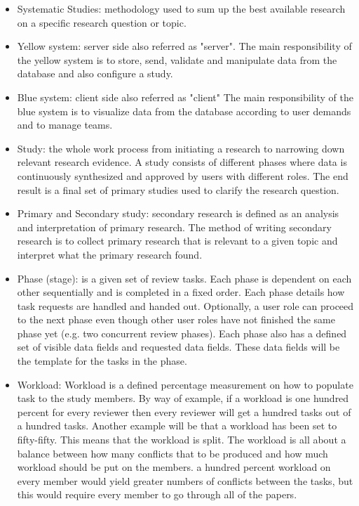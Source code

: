 \begin{itemize}
	\item Systematic Studies: methodology used to sum up the best available research on a specific research question or topic.  
	\item Yellow system: server side also referred as "server". The main responsibility of the yellow system is to store, send, validate and manipulate data from the database and also configure a study.
	\item Blue system: client side also referred as "client" The main responsibility of the blue system is to visualize data from the database according to user demands and to manage teams.
	\item Study: the whole work process from initiating a research to narrowing down relevant research evidence. A study consists of different phases where data is continuously synthesized and approved by users with different roles. The end result is a final set of primary studies used to clarify the research question. 
	\item Primary and Secondary study: secondary research is defined as an analysis and interpretation of primary research. The method of writing secondary research is to collect primary research that is relevant to a given topic and interpret what the primary research found.
	\item Phase (stage): is a given set of review tasks. Each phase is dependent on each other sequentially and is completed in a fixed order. Each phase details how task requests are handled and handed out. Optionally, a user role can proceed to the next phase even though other user roles have not finished the same phase yet (e.g. two concurrent review phases). Each phase also has a defined set of visible data fields and requested data fields. These data fields  will be the template for the tasks in the phase.
	\item Workload: Workload is a defined percentage measurement on how to populate task to the study members. By way of example, if a workload is one hundred percent for every reviewer then every reviewer will get a hundred tasks out of a hundred tasks. Another example will be that a workload has been set to fifty-fifty. This means that the workload is split. The workload is all about a balance between how many conflicts that to be produced and how much workload should be put on the members. a hundred percent workload on every member would yield greater numbers of conflicts between the tasks, but this would require every member to go through all of the papers.

\end{itemize}
